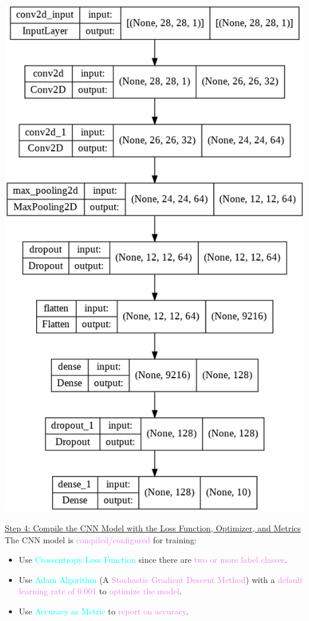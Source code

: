 \documentclass{book}
\begin{document}
\begin{center}
    \includegraphics[scale=0.4]{chapter 9/ch9_figure10.jpeg}
\end{center}
\newpage
\uline{Step 4: Compile the CNN Model with the Loss Function, Optimizer, and Metrics}\\
\vspace{1mm}
The CNN model is \textcolor{violet}{compiled/configured} for training:
\begin{itemize}
    \item Use \textcolor{cyan}{Crossentropy Loss Function} since there are \textcolor{violet}{two or more label classes}.
    \item Use \textcolor{cyan}{Adam Algorithm} (A \textcolor{violet}{Stochastic Gradient Descent Method}) with a \textcolor{violet}{default learning rate of 0.001} to \textcolor{violet}{optimize the model}.
    \item Use \textcolor{cyan}{Accuracy as Metric} to \textcolor{violet}{report on accuracy}.
\end{itemize}
\end{document}
